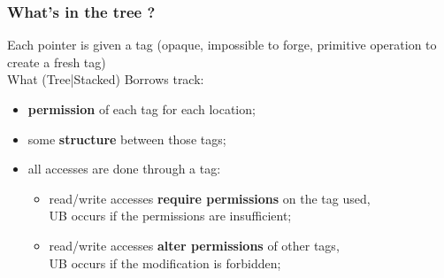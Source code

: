 \begin{frame}
    \frametitle{What's in the tree ?}
    Each pointer is given a tag (opaque, impossible to forge, primitive operation to create a fresh tag)
    ~\\
    What (Tree|Stacked) Borrows track:
    \begin{itemize}
        \item \textbf{permission} of each tag for each location;
        \item some \textbf{structure} between those tags;
        \item all accesses are done through a tag:
            \begin{itemize}
                \item read/write accesses \textbf{require permissions} on the tag used,\\
                    UB occurs if the permissions are insufficient;
                \item read/write accesses \textbf{alter permissions} of other tags,\\
                    UB occurs if the modification is forbidden;
            \end{itemize}
    \end{itemize}
\end{frame}



